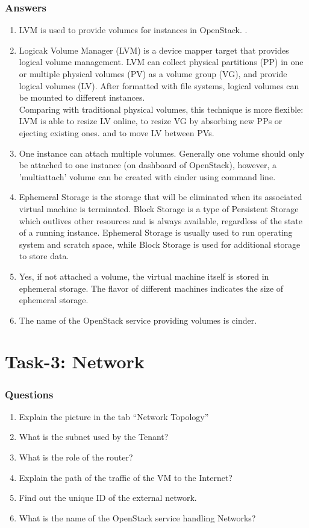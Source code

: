 \documentclass[a4paper,11pt]{article}
\begin{document}
\section{Answers}
\begin{enumerate}
    \item LVM is used to provide volumes for instances in OpenStack. \cite{lvm}. 
    \item Logicak Volume Manager (LVM) is a device mapper target that provides logical volume management. LVM can collect physical partitions (PP) in one or multiple physical volumes (PV) as a volume group (VG), and provide logical volumes (LV). After formatted with file systems, logical volumes can be mounted to different instances. \\Comparing with traditional physical volumes, this technique is more flexible: LVM is able to resize LV online, to resize VG by absorbing new PPs or ejecting existing ones. and to move LV between PVs\cite{wiki:lvm}. 
    \item One instance can attach multiple volumes. Generally one volume should only be attached to one instance (on dashboard of OpenStack), however, a 'multiattach' volume can be created with cinder using command line\cite{multiattach}. 
    \item Ephemeral Storage is the storage that will be eliminated when its associated virtual machine is terminated. Block Storage is a type of Persistent Storage which outlives other resources and is always available, regardless of the state of a running instance. Ephemeral Storage is usually used to run operating system and scratch space, while Block Storage is used for additional storage to store data\cite{storage}. 
    \item Yes, if not attached a volume, the virtual machine itself is stored in ephemeral storage. The flavor of different machines indicates the size of ephemeral storage. 
    \item The name of the OpenStack service providing volumes is cinder. 
\end{enumerate}

\newpage
\part{Task-3: Network}
\section{Questions}
\begin{enumerate}
    \item Explain the picture in the tab “Network Topology”
    \item What is the subnet used by the Tenant?
    \item What is the role of the router?
    \item Explain the path of the traffic of the VM to the Internet?
    \item Find out the unique ID of the external network.
    \item What is the name of the OpenStack service handling Networks?
\end{enumerate}




\newpage
 

\end{document}
